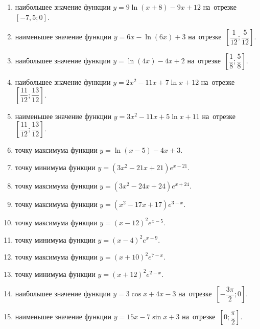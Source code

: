 \documentclass[a4paper,10pt]{article}
\begin{document}
\begin{enumerate}
\item {} наибольшее значение функции $y=9\ln \left(x+8\right)-9x+12$ на~отрезке~$\left[-7,5;0\right]$.

\item {} наименьшее значение функции $y=6x-\ln \left(6x\right)+3$ на~отрезке~$\left[\dfrac{1}{12};\dfrac{5}{12}\right]$.

\item {} наибольшее значение функции $y=\ln \left(4x\right)-4x+2$ на~отрезке~$\left[\dfrac{1}{8};\dfrac{5}{8}\right]$.

\item {} наибольшее значение функции $y=2x^2-11x+7\ln x+12$ на~отрезке~$\left[\dfrac{11}{12};\dfrac{13}{12}\right]$.

\item {} наименьшее значение функции $y=3x^2-11x+5\ln x+11$ на~отрезке~$\left[\dfrac{11}{12};\dfrac{13}{12}\right]$.

\item {} точку максимума функции $y=\ln \left(x-5\right)-4x+3$.

\item {} точку минимума функции $y=\left(3x^2-21x+21\right)e^{x-21}$.

\item {} точку максимума функции $y=\left(3x^2-24x+24\right)e^{x+24}$.

\item {} точку максимума функции $y=\left(x^2-17x+17\right)e^{3-x}$.

\item {} точку максимума функции $y=\left(x-12\right)^2e^{x-5}$.

\item {} точку минимума функции $y=\left(x-4\right)^2e^{x-9}$.

\item {} точку максимума функции $y=\left(x+10\right)^2e^{7-x}$.

\item {} точку минимума функции $y=\left(x+12\right)^2e^{2-x}$.

\item {} наибольшее значение функции $y=3\cos x+4x-3$ на~отрезке~$\left[-\dfrac{3\pi }{2};0\right]$.

\item {} наименьшее значение функции $y=15x-7\sin x+3$ на~отрезке~$\left[0;\dfrac{\pi }{2}\right]$.


\end{enumerate}
\end{document}
